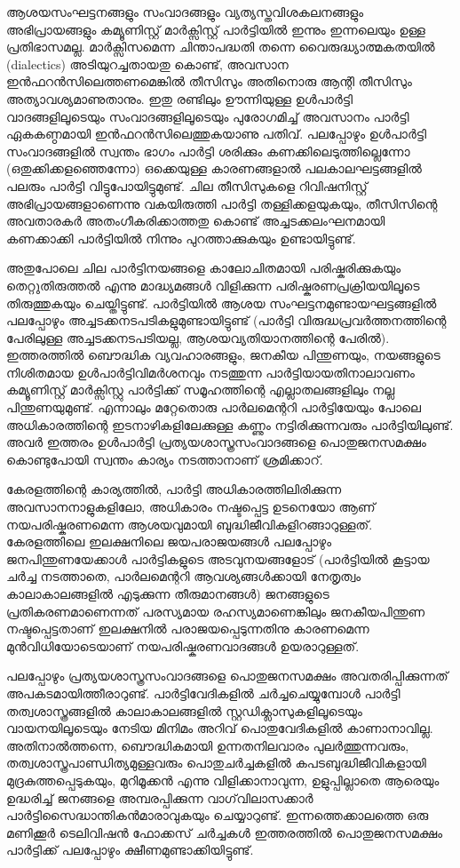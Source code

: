 \vskip 2pt

ആശയസംഘട്ടനങ്ങളും സംവാദങ്ങളും വ്യത്യസ്തവിശകലനങ്ങളും അഭിപ്രായങ്ങളും കമ്യൂണിസ്റ്റ് മാര്‍ക്സിസ്റ്റ് പാര്‍ട്ടിയില്‍ 
ഇന്നും ഇന്നലെയും ഉള്ള പ്രതിഭാസമല്ല. മാര്‍ക്സിസമെന്ന ചിന്താപദ്ധതി തന്നെ വൈരുദ്ധ്യാത്മകതയില്‍ (dialectics) 
അടിയുറച്ചതായതു കൊണ്ട്, അവസാന ഇന്‍ഫറന്‍സിലെത്തണമെങ്കില്‍ തീസിസും അതിനൊരു ആന്റി തീസിസും 
അത്യാവശ്യമാണുതാനും. ഇതു രണ്ടിലും ഊന്നിയുള്ള ഉള്‍പാര്‍ട്ടി വാദങ്ങളിലൂടെയും സംവാദങ്ങളിലൂടെയും പുരോഗമിച്ച് 
അവസാനം പാര്‍ട്ടി ഏകകണ്ഠമായി ഇന്‍ഫറന്‍സിലെത്തുകയാണു പതിവ്. പലപ്പോഴും ഉള്‍പാര്‍ട്ടി സംവാദങ്ങളില്‍ സ്വന്തം 
ഭാഗം പാര്‍ട്ടി ശരിക്കും കണക്കിലെടുത്തില്ലെന്നോ (ഒതുക്കിക്കളഞ്ഞെന്നോ) ഒക്കെയുള്ള കാരണങ്ങളാല്‍ 
പലകാലഘട്ടങ്ങളില്‍ പലരും പാര്‍ട്ടി വിട്ടുപോയിട്ടുമുണ്ട്. ചില തീസിസുകളെ റിവിഷനിസ്റ്റ് അഭിപ്രായങ്ങളാണെന്നു 
വകയിരുത്തി പാര്‍ട്ടി തള്ളിക്കളയുകയും, തീസിസിന്റെ അവതാരകര്‍ അതംഗീകരിക്കാത്തതു കൊണ്ട് 
അച്ചടക്കലംഘനമായി കണക്കാക്കി പാര്‍ട്ടിയില്‍ നിന്നും പുറത്താക്കുകയും ഉണ്ടായിട്ടുണ്ട്.

അതുപോലെ ചില പാര്‍ട്ടിനയങ്ങളെ കാലോചിതമായി പരിഷ്കരിക്കുകയും തെറ്റുതിരുത്തല്‍ എന്നു മാദ്ധ്യമങ്ങള്‍ വിളിക്കുന്ന 
പരിഷ്കരണപ്രക്രിയയിലൂടെ തിരുത്തുകയും ചെയ്തിട്ടുണ്ട്. പാര്‍ട്ടിയില്‍ ആശയ സംഘട്ടനമുണ്ടായഘട്ടങ്ങളില്‍ പലപ്പോഴും 
അച്ചടക്കനടപടികളുമുണ്ടായിട്ടുണ്ട് (പാര്‍ട്ടി വിരുദ്ധപ്രവര്‍ത്തനത്തിന്റെ പേരിലുള്ള അച്ചടക്കനടപടിയല്ല, 
ആശയവ്യതിയാനത്തിന്റെ പേരില്‍). ഇത്തരത്തില്‍ ബൌദ്ധിക വ്യവഹാരങ്ങളും, ജനകീയ പിന്തുണയും, നയങ്ങളുടെ 
നിശിതമായ ഉള്‍പാര്‍ട്ടിവിമര്‍ശനവും നടത്തുന്ന പാര്‍ട്ടിയായതിനാലാവണം കമ്യൂണിസ്റ്റ് മാര്‍ക്സിസ്റ്റു പാര്‍ട്ടിക്ക് 
സമൂഹത്തിന്റെ എല്ലാതലങ്ങളിലും നല്ല പിന്തുണയുമുണ്ട്. എന്നാലും മറ്റേതൊരു പാര്‍ലമെന്ററി പാര്‍ട്ടിയേയും പോലെ 
അധികാരത്തിന്റെ ഇടനാഴികളിലേക്കുള്ള കണ്ണും നട്ടിരിക്കുന്നവരും പാര്‍ട്ടിയിലുണ്ട്. അവര്‍ ഇത്തരം ഉള്‍പാര്‍ട്ടി 
പ്രത്യയശാസ്ത്രസംവാദങ്ങളെ പൊതുജനസമക്ഷം കൊണ്ടുപോയി സ്വന്തം കാര്യം നടത്താനാണ് ശ്രമിക്കാറ്.

കേരളത്തിന്റെ കാര്യത്തില്‍, പാര്‍ട്ടി അധികാരത്തിലിരിക്കുന്ന അവസാനനാളുകളിലോ, അധികാരം നഷ്ടപ്പെട്ട 
ഉടനെയോ ആണ് നയപരിഷ്കരണമെന്ന ആശയവുമായി ബുദ്ധിജീവികളിറങ്ങാറുള്ളത്. കേരളത്തിലെ ഇലക്ഷനിലെ 
ജയപരാജയങ്ങള്‍ പലപ്പോഴും ജനപിന്തുണയേക്കാള്‍ പാര്‍ട്ടികളുടെ അടവുനയങ്ങളോട് (പാര്‍ട്ടിയില്‍ കൂട്ടായ ചര്‍ച്ച 
നടത്താതെ, പാര്‍ലമെന്ററി ആവശ്യങ്ങള്‍ക്കായി നേതൃത്വം കാലാകാലങ്ങളില്‍ എടുക്കുന്ന തീരുമാനങ്ങള്‍) ജനങ്ങളുടെ 
പ്രതികരണമാണെന്നത് പരസ്യമായ രഹസ്യമാണെങ്കിലും ജനകീയപിന്തുണ നഷ്ടപ്പെട്ടതാണ് ഇലക്ഷനില്‍ 
പരാജയപ്പെടുന്നതിനു കാരണമെന്ന മുന്‍വിധിയോടെയാണ് നയപരിഷ്കരണവാദങ്ങള്‍ ഉയരാറുള്ളത്.

പലപ്പോഴും പ്രത്യയശാസ്ത്രസംവാദങ്ങളെ പൊതുജനസമക്ഷം അവതരിപ്പിക്കുന്നത് അപകടമായിത്തീരാറുണ്ട്. 
പാര്‍ട്ടിവേദികളില്‍ ചര്‍ച്ചചെയ്യുമ്പോള്‍ പാര്‍ട്ടി തത്വശാസ്ത്രങ്ങളില്‍ കാലാകാലങ്ങളില്‍ സ്റ്റഡിക്ലാസുകളിലൂടെയും 
വായനയിലൂടെയും നേടിയ മിനിമം അറിവ് പൊതുവേദികളില്‍ കാണാനാവില്ല. അതിനാല്‍ത്തന്നെ, ബൌദ്ധികമായി 
ഉന്നതനിലവാരം പുലര്‍ത്തുന്നവരും, തത്വശാസ്ത്രപാണ്ഡിത്യമുള്ളവരും പൊതുചര്‍ച്ചകളില്‍ കപടബുദ്ധിജീവികളായി 
മുദ്രകുത്തപ്പെടുകയും, മുറിമൂക്കന്‍ എന്നു വിളിക്കാനാവുന്ന, ഉളുപ്പില്ലാതെ ആരെയും ഉദ്ധരിച്ച് ജനങ്ങളെ അമ്പരപ്പിക്കുന്ന 
വാഗ്‌വിലാസക്കാര്‍ പാര്‍ട്ടിസൈദ്ധാന്തികന്‍മാരാവുകയും ചെയ്യാറുണ്ട്. ഇന്നത്തെക്കാലത്തെ ഒരു മണിക്കൂര്‍ 
ടെലിവിഷന്‍ ഫോക്കസ് ചര്‍ച്ചകള്‍ ഇത്തരത്തില്‍ പൊതുജനസമക്ഷം പാര്‍ട്ടിക്ക് പലപ്പോഴും ക്ഷീണമുണ്ടാക്കിയിട്ടുണ്ട്.

